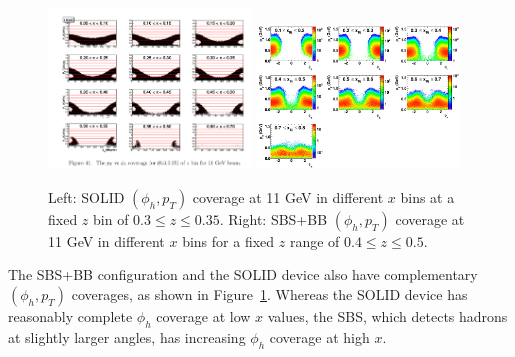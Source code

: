 \begin{figure}[h]
  \begin{center}
    \includegraphics[width=0.48\textwidth]{figures/SOLID_pt_phih_example.png}
    \includegraphics[width=0.48\textwidth]{figures/SBS_BB_pT_phih_example.png}
  \end{center}
  \caption{\label{SBS_SOLID_pt_phih_comparison} Left: SOLID $(\phi_h,p_T)$ coverage at 11 GeV in different $x$ bins at a fixed $z$ bin of $0.3 \le z \le 0.35$. Right: SBS+BB $(\phi_h,p_T)$ coverage at 11 GeV in different $x$ bins for a fixed $z$ range of $0.4 \le z \le 0.5$.}
\end{figure} 
The SBS+BB configuration and the SOLID device also have complementary $(\phi_h,p_T)$ coverages, as shown in Figure~\ref{SBS_SOLID_pt_phih_comparison}. Whereas the SOLID device has reasonably complete $\phi_h$ coverage at low $x$ values, the SBS, which detects hadrons at slightly larger angles, has increasing $\phi_h$ coverage at high $x$. 
